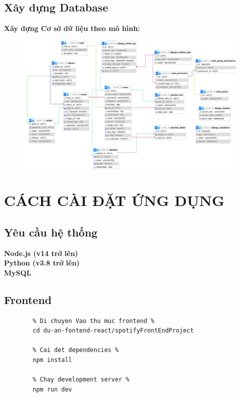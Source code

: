 \documentclass[a4paper]{article}
\begin{document}
    \subsection{Xây dựng Database}
    \textbf{Xây dựng Cơ sở dữ liệu theo mô hình:}
    
\begin{figure}[H]
    \centering
    \includegraphics[width=1\linewidth]{img/database.jpg}
    \label{fig:enter-label}
\end{figure}
    
    \section{CÁCH CÀI ĐẶT ỨNG DỤNG}
    \subsection{Yêu cầu hệ thống}
    \textbf{Node.js (v14 trở lên)\\
    Python (v3.8 trở lên)\\
    MySQL}
    
    \subsection{Frontend}
    \begin{mdframed}
        [hidealllines=true,backgroundcolor=magenta!10]
		\begin{lstlisting}
        % Di chuyen Vao thu muc frontend %
        cd du-an-fontend-react/spotifyFrontEndProject
        
        % Cai det dependencies %
        npm install
        
        % Chay development server %
        npm run dev
        \end{lstlisting}
    \end{mdframed}
\end{document}
